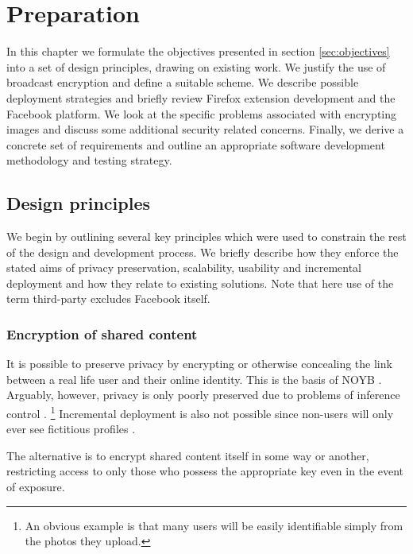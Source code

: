 \chapter{Preparation}\label{ch:preparation}

In this chapter we formulate the objectives presented in section \ref{sec:objectives} into a set of design principles, drawing on existing work. We justify the use of broadcast encryption and define a suitable scheme. We describe possible deployment strategies and briefly review Firefox extension development and the Facebook platform. We look at the specific problems associated with encrypting images and discuss some additional security related concerns. Finally, we derive a concrete set of requirements and outline an appropriate software development methodology and testing strategy.


\FloatBarrier
\section{Design principles}
\label{sec:principles}

We begin by outlining several key principles which were used to constrain the rest of the design and development process. We briefly describe how they enforce the stated aims of privacy preservation, scalability, usability and incremental deployment and how they relate to existing solutions. Note that here use of the term third-party excludes Facebook itself.


\FloatBarrier
\subsection{Encryption of shared content}

It is possible to preserve privacy by encrypting or otherwise concealing the link between a real life user and their online identity. This is the basis of NOYB \cite{noyb}. Arguably, however, privacy is only poorly preserved due to problems of inference control \cite{ross}. \footnote{An obvious example is that many users will be easily identifiable simply from the photos they upload.} Incremental deployment is also not possible since non-users will only ever see fictitious profiles \cite{facecloak}.

The alternative is to encrypt shared content itself in some way or another, restricting access to only those who possess the appropriate key even in the event of exposure.


